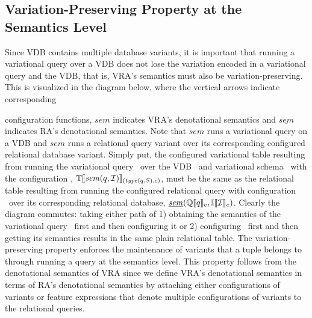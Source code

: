 \subsection{Variation-Preserving Property at the Semantics Level}
\label{sec:var-pres-sem}

Since VDB contains multiple database variants,
it is important that running a variational query over a  VDB  does not lose the variation 
encoded in a variational query and the VDB, that is, VRA's semantics
must also be variation-preserving. This is visualized in the diagram below,
where the vertical arrows indicate corresponding
%
\begin{wrapfigure}{r}{0.24\textwidth}
\begin{center}
\end{center}
\end{wrapfigure}
%
 configuration functions,
$\mathit{sem}$ indicates VRA's denotational semantics and 
$\underline{\mathit{sem}}$ indicates RA's denotational semantics. 
Note that $\mathit{sem}$ runs a variational query on a VDB and 
$\underline{\mathit{sem}}$ runs a relational query variant over its corresponding
configured relational database variant. 
%
Simply put, the configured variational table
resulting from running the variational query \vQ\ over the
VDB \vdbInst\ and variational schema \vSch\ with the configuration \config,  
$\otSem {\mathit{type} (\vQ, \vSch)} {\mathit{sem} (\vQ, \vdbInst)}$, 
must be the same as the relational table resulting from running the configured
relational query with configuration \config\ over its corresponding relational 
database, $\mathit{\underline{sem}} (\eeSem \vQ, \odbSem \vdbInst)$.
%
Clearly the diagram commutes: taking either path of 1) obtaining the 
semantics of the variational query \constrain \vQ\ first and then configuring it 
or 2)  configuring \constrain \vQ\ first and then getting its semantics
results in the same plain relational table. 
%
The variation-preserving property enforces the maintenance of variants that a 
tuple belongs to through running a query at the semantics level. 
%
This property follows from the denotational semantics of VRA since
we define VRA's denotational semantics in terms of RA's denotational semantics
by attaching either configurations of variants or feature expressions that denote
multiple configurations of variants to the relational queries. 

